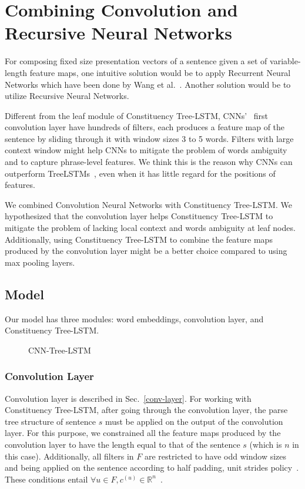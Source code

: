 \section{Combining Convolution and Recursive Neural Networks}%
For composing fixed size presentation vectors of a sentence given a set of variable-length feature maps, one intuitive solution would be to apply Recurrent Neural Networks which have been done by Wang et al.~\cite{cnn-rnn}.
Another solution would be to utilize Recursive Neural Networks.

Different from the leaf module of Constituency Tree-LSTM, CNNs'~\cite{KimCNN,DCNN,2-layer-cnn} first convolution layer have hundreds of filters, each produces a feature map of the sentence by sliding through it with window sizes 3 to 5 words.
Filters with large context window might help CNNs to mitigate the problem of words ambiguity and to capture phrase-level features.
We think this is the reason why CNNs can outperform TreeLSTMs~\cite{KimCNN}, even when it has little regard for the positions of features. 

We combined Convolution Neural Networks with Constituency Tree-LSTM.
We hypothesized that the convolution layer helps Constituency Tree-LSTM to mitigate the problem of lacking local context and words ambiguity at leaf nodes.
Additionally, using Constituency Tree-LSTM to combine the feature maps produced by the convolution layer might be a better choice compared to using max pooling layers.
\subsection{Model}
Our model has three modules: word embeddings, convolution layer, and Constituency Tree-LSTM.
\begin{figure} [H]
	\centering
	
	\caption[qwerty]{CNN-Tree-LSTM}
\end{figure}
\subsubsection{Convolution Layer}
Convolution layer is described in Sec.~\ref{conv-layer}.
For working with Constituency Tree-LSTM, after going through the convolution layer, the parse tree structure of sentence \(s\) must be applied on the output of the convolution layer. 
For this purpose, we constrained all the feature maps produced by the convolution layer to have the length equal to that of the sentence \(s\) (which is \(n\) in this case).
Additionally, all filters in \(F\) are restricted to have odd window sizes and being applied on the sentence according to half padding, unit strides policy~\cite{conv-arith}.
These conditions entail \({\forall u \in F,  c^{(u)} \in \mathbb{R}^n}\)~\cite{conv-arith}.

